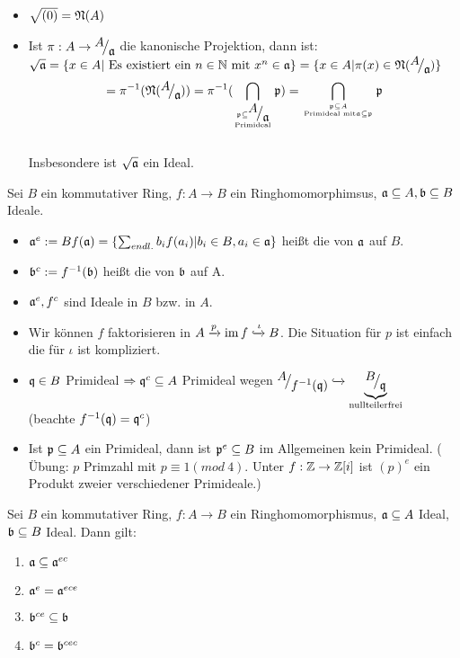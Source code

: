 \begin{anm} 
	\begin{itemize}
		\item $\sqrt{(0)} = \mathfrak{N}(A)$
		\item  Ist $\pi: A \to \QR{A}{\a} $ die kanonische Projektion, dann ist: \\
		$\sqrt{\a} = \{x \in A | \ \text{Es existiert ein } n \in \N \ \text{mit} \ x^n \in \a \} = \{x \in A| \pi(x) \in \NN(\QR{A}{\a})\} $ $$
		 = \pi^{-1}(\NN(\QR{A}{\a}))= \pi^{-1}(\bigcap_{\p \subseteq \QR{A}{\a} \atop \text{Primideal} } \p ) = \bigcap_{\p \subseteq A \atop \text{Primideal mit} \a \subseteq \p} \p  $$ \\
		Insbesondere ist $\sqrt{\mathfrak{a}}$ ein Ideal.
	\end{itemize}
\end{anm}
\begin{df}
	Sei $B$ ein kommutativer Ring, $ f: A \to B $ ein Ringhomomorphimsus, $\mathfrak{a} \subseteq A, \mathfrak{b} \subseteq B $ Ideale. \\
	\begin{itemize}
		\item[] $\mathfrak{a}^e := Bf(\mathfrak{a}) = \{\sum_{endl.} b_i f(a_i)| b_i \in B, a_i \in \mathfrak{a} \} $ heißt die  von $\mathfrak{a}$ auf $B$.
		\item[] $\mathfrak{b}^c := f^{-1}(\mathfrak{b}) $ heißt die  von $\mathfrak{b}$ auf A.
	\end{itemize}
\end{df}
\begin{anm}
	\begin{itemize}
		\item $\mathfrak{a}^{e}, f^{c} $ sind Ideale in $B$ bzw. in $A$. 
		\item Wir können $f$ faktorisieren in $ A \xrightarrow{p} \operatorname{im} f \xhookrightarrow{\iota} B $. Die Situation für $p$ ist einfach die für $ \iota $ ist kompliziert. 
		\item $\mathfrak{q} \in B $ Primideal $\Rightarrow \mathfrak{q}^{c} \subseteq A $ Primideal wegen $ \QR{A}{f^{-1}(\q)} \xhookrightarrow{} \underbrace{\QR{B}{\q}}_{\text{nullteilerfrei}}$ \\(beachte $f^{-1}(\mathfrak{q}) = \mathfrak{q}^c$)
		\item Ist $ \mathfrak{p} \subseteq A $ ein Primideal, dann ist $ \mathfrak{p}^e \subseteq B$ im Allgemeinen kein Primideal. ( Übung: $p$ Primzahl mit $p \equiv 1 (mod \ 4 )$. Unter $ f: \mathbb{Z} \to \mathbb{Z}[i] $ ist $(p)^e$ ein Produkt zweier verschiedener Primideale.)
	\end{itemize}
\end{anm}
\begin{bem} \label{11.12}
	Sei $B$ ein kommutativer Ring, $f: A \to B $ ein Ringhomomorphismus, $\mathfrak{a} \subseteq A$ Ideal, $\mathfrak{b} \subseteq B $ Ideal. Dann gilt: 
	\begin{enumerate} [label= \alph*)]
		\item $\mathfrak{a} \subseteq \mathfrak{a}^{ec} $
		\item $\mathfrak{a}^e = \mathfrak{a}^{ece}$
		\item $\mathfrak{b}^{ce} \subseteq \mathfrak{b} $
		\item $\mathfrak{b}^{c} = \mathfrak{b}^{cec}$ 
	\end{enumerate}
\end{bem}
